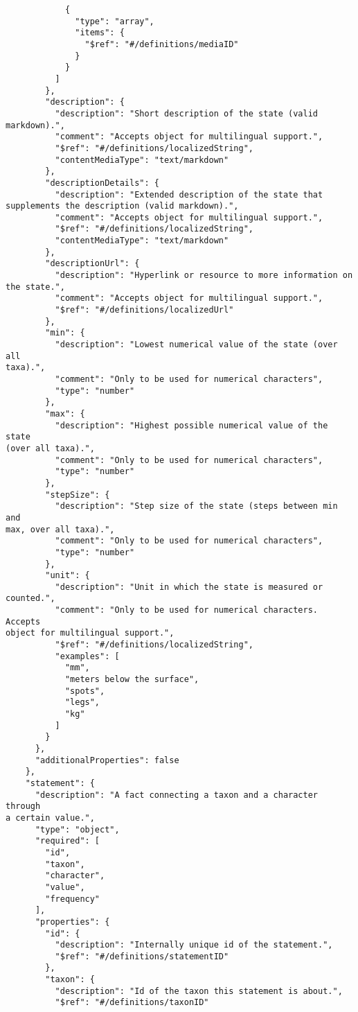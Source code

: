 \documentclass[10pt,letterpaper]{article}
\begin{document}
\begin{verbatim}
            {
              "type": "array",
              "items": {
                "$ref": "#/definitions/mediaID"
              }
            }
          ]
        },
        "description": {
          "description": "Short description of the state (valid
markdown).",
          "comment": "Accepts object for multilingual support.",
          "$ref": "#/definitions/localizedString",
          "contentMediaType": "text/markdown"
        },
        "descriptionDetails": {
          "description": "Extended description of the state that
supplements the description (valid markdown).",
          "comment": "Accepts object for multilingual support.",
          "$ref": "#/definitions/localizedString",
          "contentMediaType": "text/markdown"
        },
        "descriptionUrl": {
          "description": "Hyperlink or resource to more information on
the state.",
          "comment": "Accepts object for multilingual support.",
          "$ref": "#/definitions/localizedUrl"
        },
        "min": {
          "description": "Lowest numerical value of the state (over all
taxa).",
          "comment": "Only to be used for numerical characters",
          "type": "number"
        },
        "max": {
          "description": "Highest possible numerical value of the state
(over all taxa).",
          "comment": "Only to be used for numerical characters",
          "type": "number"
        },
        "stepSize": {
          "description": "Step size of the state (steps between min and
max, over all taxa).",
          "comment": "Only to be used for numerical characters",
          "type": "number"
        },
        "unit": {
          "description": "Unit in which the state is measured or
counted.",
          "comment": "Only to be used for numerical characters. Accepts
object for multilingual support.",
          "$ref": "#/definitions/localizedString",
          "examples": [
            "mm",
            "meters below the surface",
            "spots",
            "legs",
            "kg"
          ]
        }
      },
      "additionalProperties": false
    },
    "statement": {
      "description": "A fact connecting a taxon and a character through
a certain value.",
      "type": "object",
      "required": [
        "id",
        "taxon",
        "character",
        "value",
        "frequency"
      ],
      "properties": {
        "id": {
          "description": "Internally unique id of the statement.",
          "$ref": "#/definitions/statementID"
        },
        "taxon": {
          "description": "Id of the taxon this statement is about.",
          "$ref": "#/definitions/taxonID"

\end{verbatim}
\end{document}
